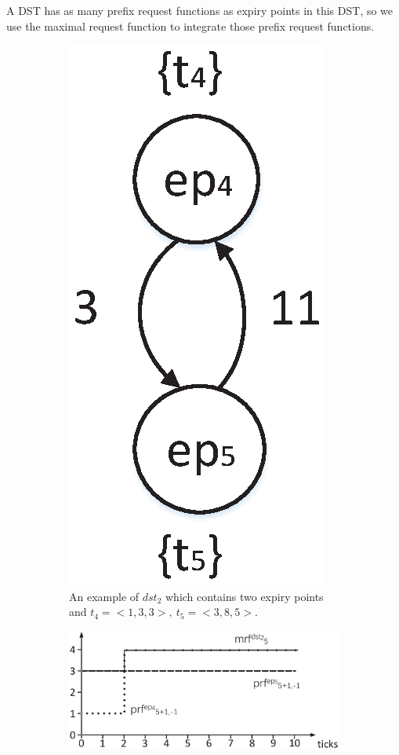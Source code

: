 \documentclass[sigconf]{acmart}
\begin{document}
A DST has as many prefix request functions as expiry points in this DST, so we use the maximal request function to integrate those prefix request functions.
\begin{figure}
  \centering
  \begin{subfigure}[t]{3.25in}
    \centering
    \includegraphics[scale=.45]{graphics/figure_dst2.eps}
    \caption{An example of $dst_2$ which contains two expiry points and $t_4=<1,3,3>,\ t_5=<3,8,5>$.}\label{figure_dst2}
  \end{subfigure}
  \quad
  \begin{subfigure}[t]{3.25in}
    \centering
    \includegraphics[scale=.325]{graphics/figure_mrf.eps}

\end{subfigure}
\end{figure}
\end{document}
